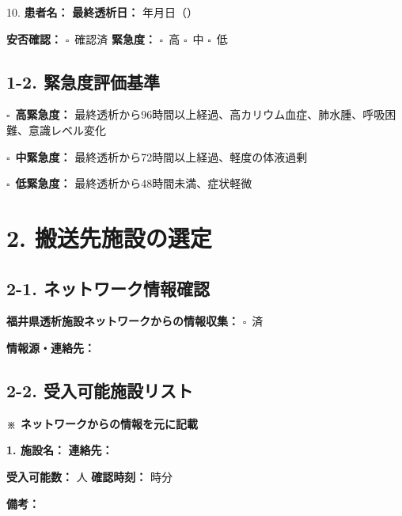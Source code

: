 \documentclass[a4paper,12pt]{jarticle}
\newcommand{\checkbox}{$\square$\ }
\newcommand{\underlinespace}[1]{\underline{\hspace{#1}}}
\begin{document}
\vspace{4mm}

10. \textbf{患者名：} \underlinespace{3cm} \quad \textbf{最終透析日：} \underlinespace{1.5cm}年\underlinespace{1cm}月\underlinespace{1cm}日（\underlinespace{1cm}）

\quad \textbf{安否確認：} \checkbox 確認済 \quad \textbf{緊急度：} \checkbox 高 \checkbox 中 \checkbox 低

\subsection*{1-2. 緊急度評価基準}
\checkbox \textbf{高緊急度：} 最終透析から96時間以上経過、高カリウム血症、肺水腫、呼吸困難、意識レベル変化

\checkbox \textbf{中緊急度：} 最終透析から72時間以上経過、軽度の体液過剰

\checkbox \textbf{低緊急度：} 最終透析から48時間未満、症状軽微

\newpage

\section*{2. 搬送先施設の選定}

\subsection*{2-1. ネットワーク情報確認}

\textbf{福井県透析施設ネットワークからの情報収集：} \checkbox 済

\quad \textbf{情報源・連絡先：} \underlinespace{10cm}

\vspace{3mm}

\subsection*{2-2. 受入可能施設リスト}

\textbf{※ ネットワークからの情報を元に記載}

\vspace{3mm}

\textbf{1. 施設名：} \underlinespace{6cm} \quad \textbf{連絡先：} \underlinespace{4cm}

\quad \textbf{受入可能数：} \underlinespace{2cm}人 \quad \textbf{確認時刻：} \underlinespace{1cm}時\underlinespace{1cm}分

\quad \textbf{備考：} \underlinespace{10cm}
\end{document}

